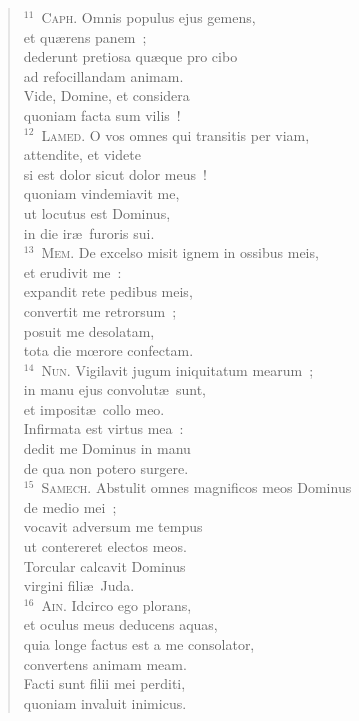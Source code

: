 \begin{flushleft}
\begin{verse}
${}^{11}$~\textsc{Caph.} Omnis populus ejus gemens,\\ et qu\ae rens panem~;\\ dederunt pretiosa qu\ae que pro cibo\\ ad refocillandam animam.\\ Vide, Domine, et considera\\ quoniam facta sum vilis~!\\
${}^{12}$~\textsc{Lamed.} O vos omnes qui transitis per viam,\\ attendite, et videte\\ si est dolor sicut dolor meus~!\\ quoniam vindemiavit me,\\ ut locutus est Dominus,\\ in die ir\ae\ furoris sui.\\
${}^{13}$~\textsc{Mem.} De excelso misit ignem in ossibus meis,\\ et erudivit me~:\\ expandit rete pedibus meis,\\ convertit me retrorsum~;\\ posuit me desolatam,\\ tota die mœrore confectam.\\
${}^{14}$~\textsc{Nun.} Vigilavit jugum iniquitatum mearum~;\\ in manu ejus convolut\ae\ sunt,\\ et imposit\ae\ collo meo.\\ Infirmata est virtus mea~:\\ dedit me Dominus in manu\\ de qua non potero surgere.\\
${}^{15}$~\textsc{Samech.} Abstulit omnes magnificos meos Dominus\\ de medio mei~;\\ vocavit adversum me tempus\\ ut contereret electos meos.\\ Torcular calcavit Dominus\\ virgini fili\ae\ Juda.\\
${}^{16}$~\textsc{Ain.} Idcirco ego plorans,\\ et oculus meus deducens aquas,\\ quia longe factus est a me consolator,\\ convertens animam meam.\\ Facti sunt filii mei perditi,\\ quoniam invaluit inimicus.\\

\end{verse}
\end{flushleft}
